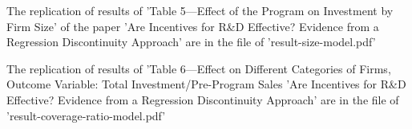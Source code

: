 \documentclass[11pt, a4paper, leqno]{article}
\begin{document}

\label{sec:size_of_firms}
The replication of results of 'Table 5—Effect of the Program on Investment by
Firm Size' of the paper 'Are Incentives for R&D Effective? Evidence from a
Regression Discontinuity Approach' are in the file of 'result-size-model.pdf'




\label{sec:coverage_ratio_and_age}
The replication of results of 'Table 6—Effect on Different Categories of Firms, Outcome Variable:
Total Investment/Pre-Program Sales 'Are Incentives for R&D Effective? Evidence from a
Regression Discontinuity Approach' are in the file of 'result-coverage-ratio-model.pdf'



\printbibliography
{}





\end{document}
